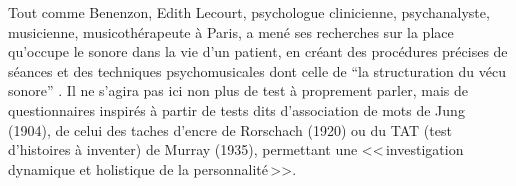 






Tout comme Benenzon, Edith Lecourt, psychologue clinicienne,
psychanalyste, musicienne, musicothérapeute à Paris, 
a mené ses recherches sur la place qu'occupe le sonore dans la vie d'un
patient, en créant des procédures précises de séances et des techniques psychomusicales dont celle de \enquote{la structuration du vécu sonore} \autocite[p.119] {lecourt_les_2017}.
Il ne s'agira pas ici non plus de test à proprement parler, mais de questionnaires inspirés à partir de tests dits
d'association de mots de Jung (1904), de celui des taches
d'encre de Rorschach (1920) ou du TAT (test d'histoires à
inventer) de Murray (1935), permettant une <<\,investigation dynamique et holistique de la
      personnalité\,>>\autocite[p.~13] {anzieu.chabert:methodes}.



